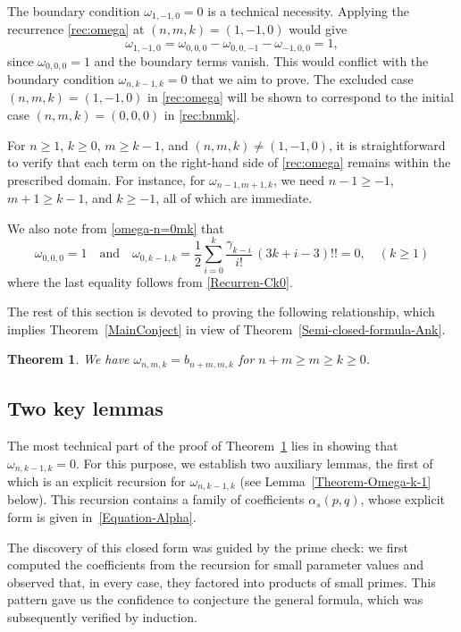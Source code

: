 \documentclass[reqno, 12pt]{article}
\newtheorem{thm}{Theorem}[section]
\theoremstyle{mydefinition}
\theoremstyle{myremark}
\numberwithin{algorithm}{section}
\begin{document}
The boundary condition $\omega_{1,-1,0}=0$ is a technical necessity. Applying the recurrence \eqref{rec:omega} at $(n,m,k)=(1,-1,0)$ would give
\[
\omega_{1,-1,0}=\omega_{0,0,0}-\omega_{0,0,-1}-\omega_{-1,0,0}=1,
\]
since $\omega_{0,0,0}=1$ and the boundary terms vanish. This would conflict with the boundary condition $\omega_{n,k-1,k}=0$ that we aim to prove. The excluded case $(n,m,k)=(1,-1,0)$ in \eqref{rec:omega} will be shown to correspond to the initial case $(n,m,k)=(0,0,0)$ in \eqref{rec:bnmk}.

For $n\ge 1$, $k\ge 0$, $m\ge k-1$, and $(n,m,k)\neq (1,-1,0)$, it is straightforward to verify that each term on the right-hand side of \eqref{rec:omega} remains within the prescribed domain. For instance, for $\omega_{n-1,m+1,k}$, we need $n-1\ge -1$, $m+1\ge k-1$, and $k\ge -1$, all of which are immediate.

We also note from \eqref{omega-n=0mk} that
\[
\omega_{0,0,0}=1
\quad\text{and}\quad
\omega_{0,k-1,k}=\frac{1}{2}\sum_{i=0}^k \frac{\gamma_{k-i}}{i!}\, (3k+i-3)!!=0,\quad (k\geq 1)
\]
where the last equality follows from \eqref{Recurren-Ck0}.


The rest of this section is devoted to proving the following relationship, which implies
Theorem~\ref{MainConject} in view of Theorem~\ref{Semi-closed-formula-Ank}.
\begin{thm}\label{Theorem=omega=bnmk}
We have $\omega_{n,m,k}=b_{n+m,m,k}$ for $n+m\geq m \geq k\geq 0$.
\end{thm}

\subsection{Two key lemmas}\label{subsection-Key-lemmas}


The most technical part of the proof of Theorem~\ref{Theorem=omega=bnmk} lies in showing that $\omega_{n,k-1,k}=0$.
For this purpose, we establish two auxiliary lemmas, the first of which is an explicit recursion for $\omega_{n,k-1,k}$ (see Lemma~\ref{Theorem-Omega-k-1} below).
This recursion contains a family of coefficients $\alpha_s(p,q)$, whose explicit form is given in~\eqref{Equation-Alpha}.

The discovery of this closed form was guided by the prime check: we first computed the coefficients from the recursion for small parameter values and observed that, in every case, they factored into products of small primes.
This pattern gave us the confidence to conjecture the general formula, which was subsequently verified by induction.
\end{document}
